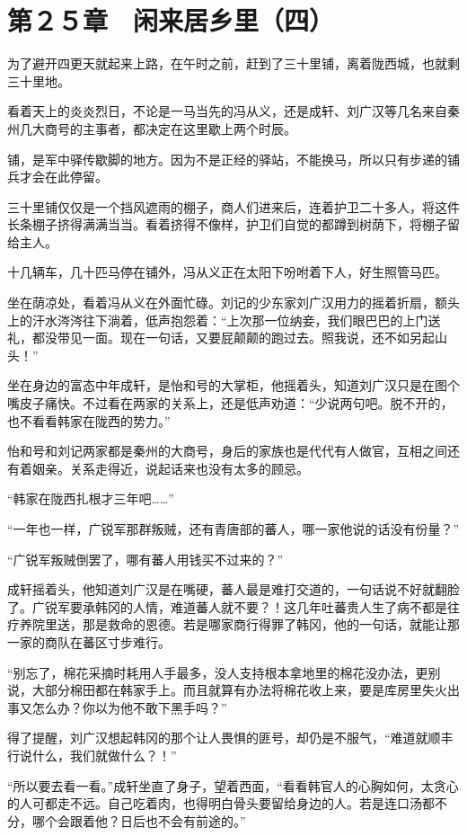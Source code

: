 \section{第２５章　闲来居乡里（四）}

为了避开四更天就起来上路，在午时之前，赶到了三十里铺，离着陇西城，也就剩三十里地。

看着天上的炎炎烈日，不论是一马当先的冯从义，还是成轩、刘广汉等几名来自秦州几大商号的主事者，都决定在这里歇上两个时辰。

铺，是军中驿传歇脚的地方。因为不是正经的驿站，不能换马，所以只有步递的铺兵才会在此停留。

三十里铺仅仅是一个挡风遮雨的棚子，商人们进来后，连着护卫二十多人，将这件长条棚子挤得满满当当。看着挤得不像样，护卫们自觉的都蹲到树荫下，将棚子留给主人。

十几辆车，几十匹马停在铺外，冯从义正在太阳下吩咐着下人，好生照管马匹。

坐在荫凉处，看着冯从义在外面忙碌。刘记的少东家刘广汉用力的摇着折扇，额头上的汗水涔涔往下淌着，低声抱怨着：“上次那一位纳妾，我们眼巴巴的上门送礼，都没带见一面。现在一句话，又要屁颠颠的跑过去。照我说，还不如另起山头！”

坐在身边的富态中年成轩，是怡和号的大掌柜，他摇着头，知道刘广汉只是在图个嘴皮子痛快。不过看在两家的关系上，还是低声劝道：“少说两句吧。脱不开的，也不看看韩家在陇西的势力。”

怡和号和刘记两家都是秦州的大商号，身后的家族也是代代有人做官，互相之间还有着姻亲。关系走得近，说起话来也没有太多的顾忌。

“韩家在陇西扎根才三年吧……”

“一年也一样，广锐军那群叛贼，还有青唐部的蕃人，哪一家他说的话没有份量？”

“广锐军叛贼倒罢了，哪有蕃人用钱买不过来的？”

成轩摇着头，他知道刘广汉是在嘴硬，蕃人最是难打交道的，一句话说不好就翻脸了。广锐军要承韩冈的人情，难道蕃人就不要？！这几年吐蕃贵人生了病不都是往疗养院里送，那是救命的恩德。若是哪家商行得罪了韩冈，他的一句话，就能让那一家的商队在蕃区寸步难行。

“别忘了，棉花采摘时耗用人手最多，没人支持根本拿地里的棉花没办法，更别说，大部分棉田都在韩家手上。而且就算有办法将棉花收上来，要是库房里失火出事又怎么办？你以为他不敢下黑手吗？”

得了提醒，刘广汉想起韩冈的那个让人畏惧的匪号，却仍是不服气，“难道就顺丰行说什么，我们就做什么？！”

“所以要去看一看。”成轩坐直了身子，望着西面，“看看韩官人的心胸如何，太贪心的人可都走不远。自己吃着肉，也得明白骨头要留给身边的人。若是连口汤都不分，哪个会跟着他？日后也不会有前途的。”

